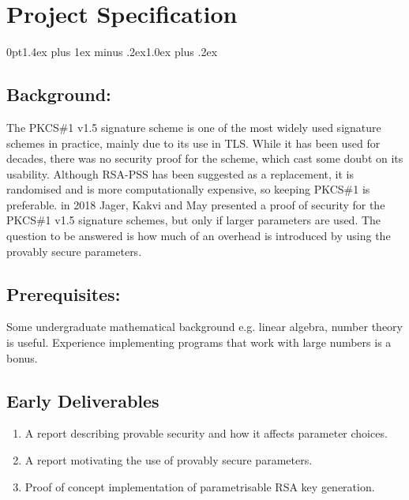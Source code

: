 \documentclass[]{final_report}
\theoremstyle{definition}
\begin{document}

\chapter*{Project Specification}
{
\titlespacing*{\section}
{0pt}{1.4ex plus 1ex minus .2ex}{1.0ex plus .2ex}

\section*{Background:}
The PKCS\#1 v1.5 signature scheme is one of the most widely used signature schemes in practice, mainly due to its use in TLS. While it has been used for decades, there was no security proof for the scheme, which cast some doubt on its usability. Although RSA-PSS has been suggested as a replacement, it is randomised and is more computationally expensive, so keeping PKCS\#1 is preferable. in 2018 Jager, Kakvi and May presented a proof of security for the PKCS\#1 v1.5 signature schemes, but only if larger parameters are used. The question to be answered is how much of an overhead is introduced by using the provably secure parameters.

\section*{Prerequisites:}
Some undergraduate mathematical background e.g. linear algebra, number theory is useful. Experience implementing programs that work with large numbers is a bonus.

\section*{Early Deliverables}
\begin{enumerate}
    \item A report describing provable security and how it affects parameter choices.
    \item A report motivating the use of provably secure parameters.
    \item Proof of concept implementation of parametrisable RSA key generation.
\end{enumerate}

}
\end{document}
